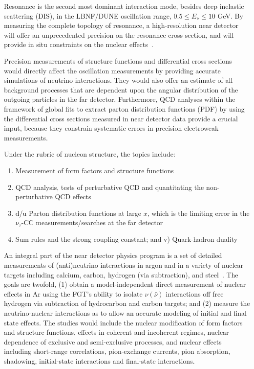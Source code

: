 Resonance is the second most dominant interaction mode, besides deep inelastic scattering (DIS),  
in the LBNF/DUNE oscillation range, $0.5 \leq E_\nu \leq 10$ GeV.
 By measuring the complete 
topology of resonance, a high-resolution near detector 
will offer an unprecedented precision on the resonance cross section, and will provide in situ constraints on the 
nuclear effects~\cite{near detector-RES}.  


Precision measurements of  structure functions and 
differential cross sections would directly affect the oscillation measurements 
by providing accurate simulations of neutrino interactions. They would also offer an estimate of 
all background processes that are dependent upon the angular distribution of 
the outgoing particles in the far detector. 
 Furthermore, QCD analyses within the framework of global fits to 
extract parton distribution functions (PDF) by using the differential cross sections 
measured in near detector data provide a crucial input,  because they  constrain systematic errors in 
precision electroweak measurements.

Under the rubric of nucleon structure, the topics  include: 
\begin{enumerate}
\item Measurement of form factors and structure functions
\item QCD analysis,  tests of perturbative QCD and quantitating the non-perturbative 
QCD effects
\item d/u Parton distribution functions at large $x$, which is the limiting error in the 
$\nu_\tau$-CC measurements/searches at the far detector
\item Sum rules and the strong coupling constant; and v) Quark-hadron duality
\end{enumerate}

An integral part of the near detector physics program is a set of detailed measurements of (anti)neutrino 
interactions in argon and in a variety of nuclear targets including calcium, carbon, hydrogen (via subtraction), 
and steel~\cite{near detector-NUCL}. 
The goals are twofold, (1) obtain a model-independent direct measurement of nuclear effects in Ar 
using the FGT's ability to isolate $\nu (\bar \nu)$ interactions off free hydrogen 
via subtraction of hydrocarbon and carbon targets; and
(2) measure the neutrino-nuclear interactions as to allow an accurate modeling 
of initial and final state effects. The studies would include 
the nuclear modification of form factors and structure functions, effects in coherent and incoherent 
regimes, nuclear dependence of exclusive and semi-exclusive processes, and nuclear 
effects including short-range correlations, pion-exchange currents, pion absorption, shadowing, 
initial-state interactions and final-state interactions. 

